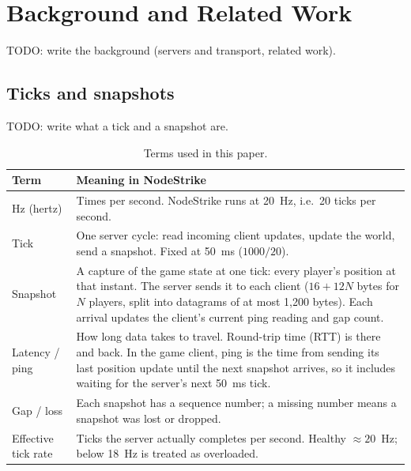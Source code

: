\section{Background and Related Work}
TODO: write the background (servers and transport, related work).

\subsection{Ticks and snapshots}
TODO: write what a tick and a snapshot are.

\begin{table}[H]
\centering
\small
\begin{tabular}{@{}p{}p{}@{}}
\toprule
Term & Meaning in NodeStrike \\
\midrule
Hz (hertz) & Times per second. NodeStrike runs at 20~Hz, i.e.\ 20 ticks per second. \\
Tick & One server cycle: read incoming client updates, update the world, send a snapshot. Fixed at 50~ms ($1000/20$). \\
Snapshot & A capture of the game state at one tick: every player's position at that instant. The server sends it to each client ($16 + 12N$ bytes for $N$ players, split into datagrams of at most 1{,}200 bytes). Each arrival updates the client's current ping reading and gap count. \\
Latency / ping & How long data takes to travel. Round-trip time (RTT) is there and back. In the game client, ping is the time from sending its last position update until the next snapshot arrives, so it includes waiting for the server's next 50~ms tick. \\
Gap / loss & Each snapshot has a sequence number; a missing number means a snapshot was lost or dropped. \\
Effective tick rate & Ticks the server actually completes per second. Healthy $\approx 20$~Hz; below 18~Hz is treated as overloaded. \\
\bottomrule
\end{tabular}
\caption{Terms used in this paper.}\label{tab:terms}
\end{table}

